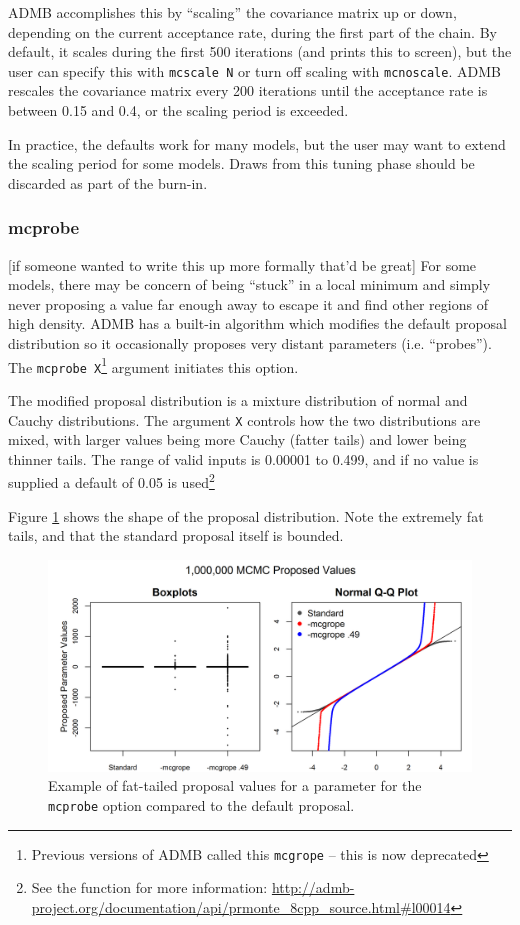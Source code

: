 \documentclass{article}\usepackage[]{graphicx}\usepackage[]{color}
\begin{document}
ADMB accomplishes this by ``scaling'' the covariance matrix
up or down, depending on the current acceptance rate, during
the first part of the chain. By default, it scales during
the first 500 iterations (and prints this to screen), but
the user can specify this with \texttt{mcscale N} or turn
off scaling with \texttt{mcnoscale}. ADMB rescales the
covariance matrix every 200 iterations until the acceptance
rate is between 0.15 and 0.4, or the scaling period is
exceeded.

In practice, the defaults work for many models, but the user
may want to extend the scaling period for some models. Draws
from this tuning phase should be discarded as part of the
burn-in.
\subsubsection{mcprobe}\label{sec:mcprobe}
\large{[if someone wanted to write this up more formally
  that'd be great]}
For some models, there may be concern of being ``stuck'' in
a local minimum and simply never proposing a value far
enough away to escape it and find other regions of high
density. ADMB has a built-in algorithm which modifies the
default proposal distribution so it occasionally proposes
very distant parameters (i.e. ``probes''). The
\texttt{mcprobe X}\footnote{Previous versions of ADMB called
  this \texttt{mcgrope} -- this is now deprecated} argument
initiates this option.

The modified proposal distribution is a mixture distribution
of normal and Cauchy distributions. The argument \texttt{X}
controls how the two distributions are mixed, with larger
values being more Cauchy (fatter tails) and lower being
thinner tails. The range of valid inputs is 0.00001 to
0.499, and if no value is supplied a default of 0.05 is
used\footnote{See the function for more information:
  \url{http://admb-project.org/documentation/api/prmonte\_8cpp\_source.html\#l00014}}

Figure \ref{fig:mcgrope_example} shows the shape of the
proposal distribution. Note the extremely fat tails, and
that the standard proposal itself is bounded.

\begin{figure}[h]
  \centering
  \includegraphics[width=5in]{../plots/mcgrope_example.png}
  \caption{Example of fat-tailed proposal values for a
    parameter for the \texttt{mcprobe} option compared to
    the default proposal.}
  \label{fig:mcgrope_example}
\end{figure}
\end{document}
